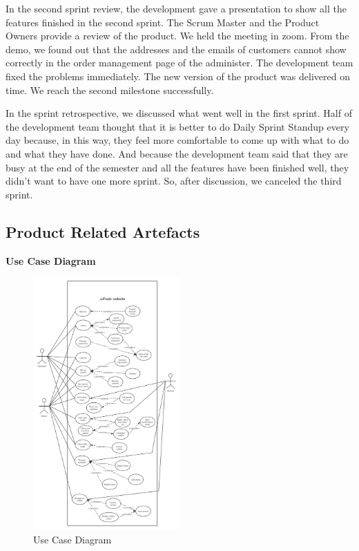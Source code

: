 In the second sprint review, the development gave a presentation to show all the features finished in the second sprint. The Scrum Master and the Product Owners provide a review of the product. We held the meeting in zoom. From the demo, we found out that the addresses and the emails of customers cannot show correctly in the order management page of the administer. The development team fixed the problems immediately. The new version of the product was delivered on time. We reach the second milestone successfully.

In the sprint retrospective, we discussed what went well in the first sprint. Half of the development team thought that it is better to do Daily Sprint Standup every day because, in this way, they feel more comfortable to come up with what to do and what they have done. And because the development team said that they are busy at the end of the semester and all the features have been finished well, they didn't want to have one more sprint. So, after discussion, we canceled the third sprint.

\clearpage
\subsection{Product Related Artefacts}
\textbf{Use Case Diagram}
\begin{figure}[htp]
\centering
\includegraphics[width=0.5\textwidth]{Figures/useCaseDiagram.png}
\caption{Use Case Diagram}
\label{fig:useCaseDiagram}
\end{figure}


